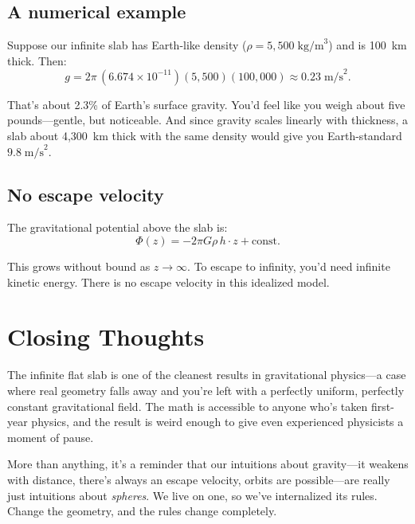 \documentclass[11pt, letterpaper]{article}
\begin{document}
\subsection{A numerical example}

Suppose our infinite slab has Earth-like density ($\rho = 5{,}500\;\text{kg/m}^3$) and is 100~km thick. Then:
\begin{equation}
  g = 2\pi \,(6.674 \times 10^{-11})(5{,}500)(100{,}000) \approx 0.23\;\text{m/s}^2.
\end{equation}

That's about 2.3\% of Earth's surface gravity. You'd feel like you weigh about five pounds---gentle, but noticeable. And since gravity scales linearly with thickness, a slab about 4{,}300~km thick with the same density would give you Earth-standard $9.8\;\text{m/s}^2$.

\subsection{No escape velocity}

The gravitational potential above the slab is:
\begin{equation}
  \Phi(z) = -2\pi G \rho\, h \cdot z + \text{const.}
\end{equation}

This grows without bound as $z \to \infty$. To escape to infinity, you'd need infinite kinetic energy. There is no escape velocity in this idealized model.


\section*{Closing Thoughts}

The infinite flat slab is one of the cleanest results in gravitational physics---a case where real geometry falls away and you're left with a perfectly uniform, perfectly constant gravitational field. The math is accessible to anyone who's taken first-year physics, and the result is weird enough to give even experienced physicists a moment of pause.

More than anything, it's a reminder that our intuitions about gravity---it weakens with distance, there's always an escape velocity, orbits are possible---are really just intuitions about \textit{spheres}. We live on one, so we've internalized its rules. Change the geometry, and the rules change completely.
\end{document}
